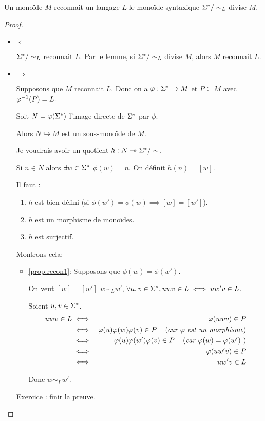 \begin{prop}
	Un monoïde  $M$ reconnait  un langage $L$ \ssi le monoïde syntaxique $\Sigma^{*} / \sim_L$ divise $M$.
\end{prop}

\begin{proof}

	\begin{itemize}
		\item $\Leftarrow$

		      $\Sigma^{*} / \sim_L$ reconnait $L$. Par le lemme, si $\Sigma^{*} / \sim_L$ divise $M$, alors $M$ reconnait $L$.

		\item $\Rightarrow$

		      Supposons que $M$ reconnait $L$. Donc on a $\varphi : \Sigma^{*} \to M$ et $P \subseteq M$ avec $\varphi^{-1} (P) = L$.

		      Soit $N = \varphi (\Sigma^{*})$ l'image directe de $\Sigma^{*}$ par $\phi$.

		      Alors $N \hookrightarrow M$ est un sous-monoïde de $M$.

		      Je voudrais avoir un quotient $h : N \twoheadrightarrow \Sigma^{*}/\sim$.

		      Si $n \in N$ alors $\exists w \in \Sigma^{*}$ \tq $\phi(w) = n$. On définit $h(n) = [w]$.

		      Il faut \mq : 
		      \begin{enumerate}
			      \item $h$ est bien défini (si $\phi (w') = \phi (w) \implies [w] = [w']$). \label{prop:recon1}
			      \item $h$ est un morphisme de monoïdes.
			      \item $h$ est surjectif.
		      \end{enumerate}

		      Montrons cela:
		      \begin{itemize}
			      \item \ref{prop:recon1}: Supposons que $\phi(w) = \phi (w')$.

			            On veut \mq $[w]=[w']$ \cad $w \sim_L w'$, \cad $\forall u,v \in \Sigma^{*}, uwv \in L \iff uw'v \in L$.

			            Soient $u,v \in \Sigma^{*}$.
			            \begin{eqnarray*}
				            uwv \in L &\iff& \varphi (uwv) \in P\\
				            &\iff& \varphi (u)\varphi(w) \varphi(v) \in P \quad\left(\textit{car $\varphi$ est un morphisme}\right) \\
				            &\iff& \varphi (u)\varphi(w') \varphi(v) \in P \quad\left(\textit{car $\varphi (w) = \varphi (w')$ }\right) \\
				            &\iff& \varphi (uw'v) \in P\\
				            &\iff& uw'v \in L
			            \end{eqnarray*}

			            Donc $w \sim_L w'$.
		      \end{itemize}
		      Exercice : finir la preuve.
	\end{itemize}
\end{proof}
